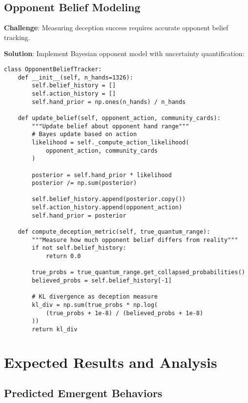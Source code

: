 \documentclass[11pt,a4paper]{article}
\begin{document}
\subsection{Opponent Belief Modeling}

\textbf{Challenge}: Measuring deception success requires accurate opponent belief tracking.

\textbf{Solution}: Implement Bayesian opponent model with uncertainty quantification:

\begin{lstlisting}
class OpponentBeliefTracker:
    def __init__(self, n_hands=1326):
        self.belief_history = []
        self.action_history = []
        self.hand_prior = np.ones(n_hands) / n_hands
        
    def update_belief(self, opponent_action, community_cards):
        """Update belief about opponent hand range"""
        # Bayes update based on action
        likelihood = self._compute_action_likelihood(
            opponent_action, community_cards
        )
        
        posterior = self.hand_prior * likelihood
        posterior /= np.sum(posterior)
        
        self.belief_history.append(posterior.copy())
        self.action_history.append(opponent_action)
        self.hand_prior = posterior
        
    def compute_deception_metric(self, true_quantum_range):
        """Measure how much opponent belief differs from reality"""
        if not self.belief_history:
            return 0.0
            
        true_probs = true_quantum_range.get_collapsed_probabilities()
        believed_probs = self.belief_history[-1]
        
        # KL divergence as deception measure
        kl_div = np.sum(true_probs * np.log(
            (true_probs + 1e-8) / (believed_probs + 1e-8)
        ))
        return kl_div
\end{lstlisting}

\section{Expected Results and Analysis}

\subsection{Predicted Emergent Behaviors}
\end{document}
